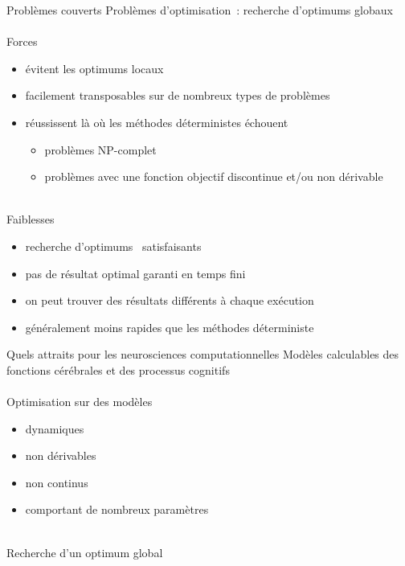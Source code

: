\documentclass{beamer}
\begin{document}
\begin{frame}{Problèmes couverts}
    Problèmes d'optimisation~: recherche d'optimums globaux\\
    ~\\
    Forces
    \begin{itemize}
        \item évitent les optimums locaux
        \item facilement transposables sur de nombreux types de problèmes
        \item réussissent là où les méthodes déterministes échouent
        \begin{itemize}
            \item problèmes NP-complet
            \item problèmes avec une fonction objectif discontinue et/ou non
                  dérivable
        \end{itemize}
    \end{itemize}
    ~\\
    Faiblesses
    \begin{itemize}
        \item recherche d'optimums \og~satisfaisants~\fg
        \item pas de résultat optimal garanti en temps fini
        \item on peut trouver des résultats différents à chaque exécution
        \item généralement moins rapides que les méthodes déterministe
    \end{itemize}
\end{frame}

\begin{frame}{Quels attraits pour les neurosciences computationnelles}
    Modèles calculables des fonctions cérébrales et des processus cognitifs\\
    ~\\
    Optimisation sur des modèles
    \begin{itemize}
        \item dynamiques
        \item non dérivables
        \item non continus
        \item comportant de nombreux paramètres
    \end{itemize}
    ~\\
    Recherche d'un optimum global
\end{frame}

\end{document}
